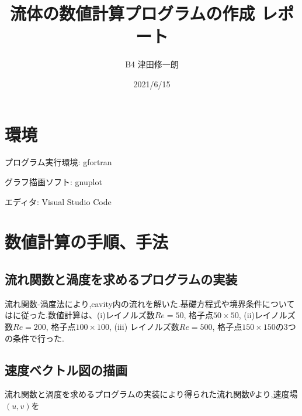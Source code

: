 \documentclass[upLaTeX,a4paper]{jsarticle}
\title{流体の数値計算プログラムの作成 レポート}
\author{B4 津田修一朗}
\date{2021/6/15}
\begin{document}
\maketitle

\section{環境}
プログラム実行環境: gfortran

グラフ描画ソフト: gnuplot

エディタ: Visual Studio Code

\section{数値計算の手順、手法}
\subsection{流れ関数と渦度を求めるプログラムの実装}
流れ関数-渦度法により,cavity内の流れを解いた.基礎方程式や境界条件については\cite{1}に従った.数値計算は、(i)レイノルズ数$Re = 50$, 格子点$50\times 50$, (ii)レイノルズ数$Re = 200$, 格子点$100\times 100$,
(iii) レイノルズ数$Re = 500$, 格子点$150\times 150$の3つの条件で行った.

\subsection{速度ベクトル図の描画}
流れ関数と渦度を求めるプログラムの実装により得られた流れ関数$\varPsi$より,速度場$(u, v)$を
\end{document}
